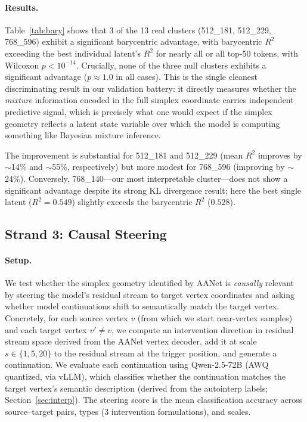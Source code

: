 \documentclass{article}
\begin{document}
\paragraph{Results.} Table~\ref{tab:bary} shows that 3 of the 13 real clusters
(512\_181, 512\_229, 768\_596) exhibit a significant barycentric advantage, with
barycentric $R^2$ exceeding the best individual latent's $R^2$ for nearly all or
all top-50 tokens, with Wilcoxon $p < 10^{-14}$.  Crucially, none of the three null
clusters exhibits a significant advantage ($p \approx 1.0$ in all cases).  This is
the single cleanest discriminating result in our validation battery: it directly
measures whether the \emph{mixture} information encoded in the full simplex
coordinate carries independent predictive signal, which is precisely what one would
expect if the simplex geometry reflects a latent state variable over which the model
is computing something like Bayesian mixture inference.

The improvement is substantial for 512\_181 and 512\_229 (mean $R^2$ improves by
$\sim$14\% and $\sim$55\%, respectively) but more modest for 768\_596 (improving by
$\sim$24\%).  Conversely, 768\_140---our most interpretable cluster---does not show
a significant advantage despite its strong KL divergence result; here the best single
latent ($R^2 = 0.549$) slightly exceeds the barycentric $R^2$ ($0.528$).

\subsection{Strand 3: Causal Steering}
\label{sec:steering}

\paragraph{Setup.}  We test whether the simplex geometry identified by AANet is
\emph{causally} relevant by steering the model's residual stream to target vertex
coordinates and asking whether model continuations shift to semantically match the
target vertex.  Concretely, for each source vertex $v$ (from which we start near-vertex
samples) and each target vertex $v' \neq v$, we compute an intervention direction in
residual stream space derived from the AANet vertex decoder, add it at scale
$s \in \{1, 5, 20\}$ to the residual stream at the trigger position, and generate a
continuation.  We evaluate each continuation using Qwen-2.5-72B (AWQ quantized, via
vLLM), which classifies whether the continuation matches the target vertex's semantic
description (derived from the autointerp labels; Section~\ref{sec:interp}).  The
steering score is the mean classification accuracy across source--target pairs,
types (3 intervention formulations), and scales.
\end{document}
